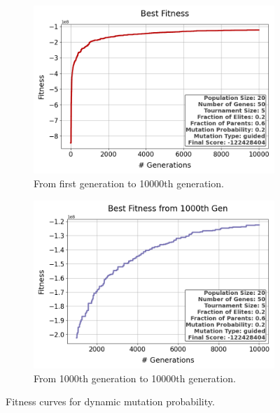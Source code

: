 \documentclass{assignment}
\begin{document}
\begin{figure}[H]
    \begin{subfigure}{0.5\textwidth}
        \includegraphics[width=\textwidth]{figures/best_fitness_outputPROB_20_50_5_0.2_0.6_0.2_guided.png}
        \caption{From first generation to 10000th generation.}
    \end{subfigure}\hfill
    \begin{subfigure}{0.5\textwidth}
        \includegraphics[width=\textwidth]{figures/best_fitness_1000_outputPROB_20_50_5_0.2_0.6_0.2_guided.png}
        \caption{From 1000th generation to 10000th generation.}
    \end{subfigure}
    \caption{Fitness curves for dynamic mutation probability.}
\label{fig:dynamic_mutation}
\end{figure}
\end{document}
